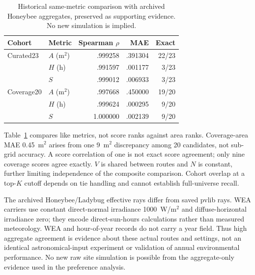 \documentclass{llncs}
\begin{document}
\begin{table}[tbp]\caption{Historical same-metric comparison with archived Honeybee aggregates, preserved as supporting evidence. No new simulation is implied.}\label{tab:agreement}\centering
\begin{tabular}{llrrr}\toprule Cohort & Metric & Spearman $\rho$ & MAE & Exact\\\midrule
Curated23 & $A$ (m$^2$) & .999258 & .391304 & 22/23\\ & $H$ (h) & .991597 & .001177 & 3/23\\ & $S$ & .999012 & .006933 & 3/23\\
Coverage20 & $A$ (m$^2$) & .997668 & .450000 & 19/20\\ & $H$ (h) & .999624 & .000295 & 9/20\\ & $S$ & 1.000000 & .002139 & 9/20\\\bottomrule\end{tabular}\end{table}

Table~\ref{tab:agreement} compares like metrics, not score ranks against area ranks. Coverage-area MAE 0.45~m$^2$ arises from one 9~m$^2$ discrepancy among 20 candidates, not sub-grid accuracy. A score correlation of one is not exact score agreement; only nine coverage scores agree exactly. $V$ is shared between routes and $N$ is constant, further limiting independence of the composite comparison. Cohort overlap at a top-$K$ cutoff depends on tie handling and cannot establish full-universe recall.

The archived Honeybee/Ladybug effective rays differ from saved pvlib rays. WEA carriers use constant direct-normal irradiance 1000~W/m$^2$ and diffuse-horizontal irradiance zero; they encode direct-sun-hours calculations rather than measured meteorology. WEA and hour-of-year records do not carry a year field. Thus high aggregate agreement is evidence about these actual routes and settings, not an identical astronomical-input experiment or validation of annual environmental performance. No new raw site simulation is possible from the aggregate-only evidence used in the preference analysis.
\end{document}
